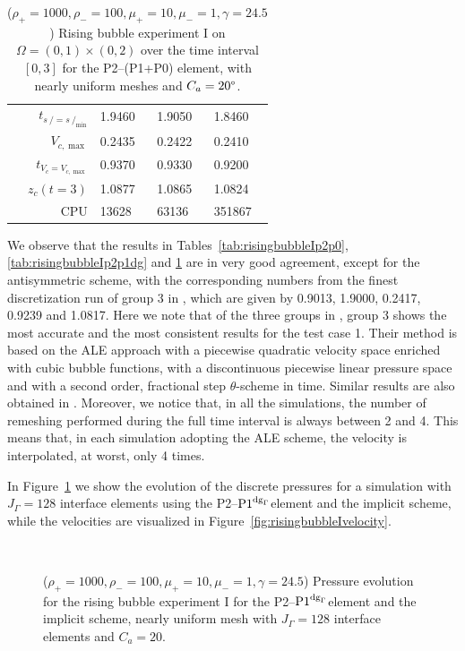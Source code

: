 \documentclass[a4paper,12pt,onecolumn]{article}
\newcommand{\pdg}{${\rm P1}^{{\rm dg}_\Gamma}$} %
\newcommand{\strikes}{\mbox{$s\!\!\!\!\:/$}}
\begin{document}
\begin{table}
\begin{tabular}{rlll}
$t_{\strikes = \strikes_{\min}}$ & 1.9460 & 1.9050 & 1.8460 \\
$V_{c,\max}$                     & 0.2435 & 0.2422 & 0.2410 \\
$t_{V_c = V_{c,\max}}$           & 0.9370 & 0.9330 & 0.9200 \\
$z_c(t=3)$                       & 1.0877 & 1.0865 & 1.0824 \\
CPU                              &  13628 &  63136 & 351867 \\
\hline
\end{tabular}
\hspace*{-3.25cm}
\caption[Navier--Stokes rising bubble I benchmark values P2--(P1+P0)]
{($\rho_+ = 1000,\rho_- = 100,\mu_+ = 10,\mu_- =1,\gamma = 24.5$)
Rising bubble experiment I on $\Omega = (0,1) \times (0,2)$ over the time
interval $[0,3]$ for the P2--(P1+P0) element, with nearly uniform meshes and
$C_a=20\degree$.}
\label{tab:risingbubbleIp2p1p0}
\end{table}
We observe that the results in Tables~\ref{tab:risingbubbleIp2p0},
\ref{tab:risingbubbleIp2p1dg} and \ref{tab:risingbubbleIp2p1p0} are in very
good agreement, except for the antisymmetric scheme, with the corresponding
numbers from the finest discretization run of group 3 in \cite{HysingTKPBGT09},
which are given by 0.9013, 1.9000, 0.2417, 0.9239 and 1.0817. Here we note that
of the three groups in \cite{HysingTKPBGT09}, group 3 shows the most accurate
and the most consistent results for the test case 1. Their method is based on
the ALE approach with a piecewise quadratic velocity space enriched with cubic
bubble functions, with a discontinuous piecewise linear pressure space and with
a second order, fractional step $\theta$-scheme in time. Similar results are
also obtained in \cite{fluidfbp}. Moreover, we notice that, in all the
simulations, the number of remeshing performed during the full time interval is
always between 2 and 4. This means that, in each simulation adopting the ALE
scheme, the velocity is interpolated, at worst, only 4 times.

In Figure~\ref{fig:risingbubbleIpressure} we show the evolution of the discrete
pressures for a simulation with $J_\Gamma=128$ interface elements using the
P2--\pdg element and the implicit scheme, while the velocities are visualized
in Figure~\ref{fig:risingbubbleIvelocity}.
\begin{figure}[htbp]
\centering
{}
\\
\caption[Navier--Stokes rising bubble I pressure]
{($\rho_+ = 1000,\rho_- = 100,\mu_+ = 10,\mu_- =1,\gamma = 24.5$)
Pressure evolution for the rising bubble experiment I for the P2--\pdg element
and the implicit scheme, nearly uniform mesh with $J_\Gamma=128$ interface
elements and $C_a=20$\textdegree.}
\label{fig:risingbubbleIpressure}
\end{figure}
\end{document}
